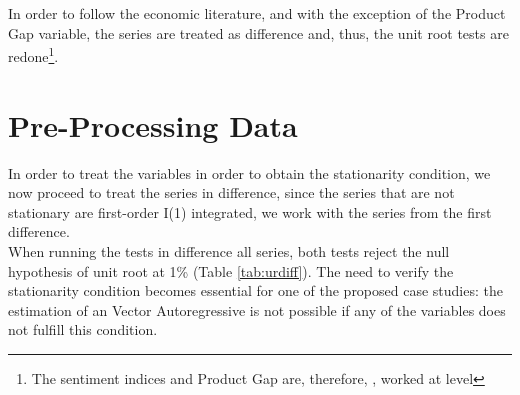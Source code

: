 In order to follow the economic literature, and with the exception of the Product Gap variable, the series are treated as difference and, thus, the unit root tests are redone\footnote{The sentiment indices and Product Gap are, therefore, , worked at level}.\\

\section{Pre-Processing Data}
In order to treat the variables in order to obtain the stationarity condition, we now proceed to treat the series in difference, since the series that are not stationary are first-order I(1) integrated, we work with the series from the first difference.\\

When running the tests in difference all series, both tests reject the null hypothesis of unit root at 1\% (Table \ref{tab:urdiff}). The need to verify the stationarity condition becomes essential for one of the proposed case studies: the estimation of an Vector Autoregressive is not possible if any of the variables does not fulfill this condition.



